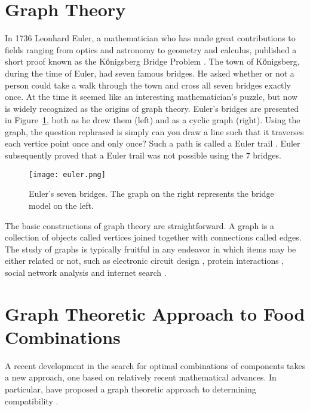 \section{Graph Theory}
In 1736 Leonhard Euler, a mathematician who has made great contributions to fields ranging from optics and astronomy to geometry and calculus, published a short proof known as the Kӧnigsberg Bridge Problem \citep{Euler1736}. The town of Kӧnigsberg, during the time of Euler, had seven famous bridges.  He asked whether or not a person could take a walk through the town and cross all seven bridges exactly once.  At the time it seemed like an interesting mathematician’s puzzle, but now is widely recognized as the origins of graph theory. Euler’s bridges are presented in Figure~\ref{fig:eulerbridges}, both as he drew them (left) and as a cyclic graph (right).  Using the graph, the question rephrased is simply can you draw a line such that it traverses each vertice point once and only once?  Such a path is called a Euler trail \citep{Bollobaas1998}.  Euler subsequently proved that a Euler trail was not possible using the 7 bridges.

\begin{figure}[h!]
\caption[Euler's seven bridges.]{Euler's seven bridges.  The graph on the right represents the bridge model on the left.}
\centering
\texttt{[image: euler.png]}
\label{fig:eulerbridges}
\end{figure}


The basic constructions of graph theory are straightforward.  A graph is a collection of objects called vertices \citep{Bollobaas1998} joined together with connections called edges.  The study of graphs is typically fruitful in any endeavor in which items may be either related or not, such as electronic circuit design \citep{Bollobaas1998},  protein interactions \citep{Palla2005}, social network analysis \citep{Knoke2008} and internet search \citep{Brin1998}.  

\section{Graph Theoretic Approach to Food Combinations}
A recent development in the search for optimal combinations of components takes a new approach, one based on relatively recent mathematical advances.  In particular, \citet{Ennisa} have proposed a graph theoretic approach to determining compatibility \citep[see also][]{Ennis2010, Ennis2011}.

